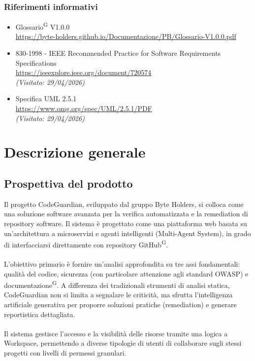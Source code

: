 \documentclass[a4paper, 11pt]{article}
\newcommand{\refterm}[1]{#1\textsuperscript{G}}
\newcommand{\lastVisited}[3]{\textit{(Visitato: #1/#2/#3)}}
\begin{document}
\subsubsection{Riferimenti informativi}
\begin{itemize}
	\item
		\refterm{Glossario} V1.0.0\\
		\url{https://byte-holders.github.io/Documentazione/PB/Glossario-V1.0.0.pdf}
	\item
		830-1998 - IEEE Recommended Practice for Software Requirements Specifications\\
		\url{https://ieeexplore.ieee.org/document/720574}\\
		\lastVisited{29}{04}{2026}
	\item
		Specifica UML 2.5.1\\
		\url{https://www.omg.org/spec/UML/2.5.1/PDF}\\
		\lastVisited{29}{04}{2026}
\end{itemize}

\section{Descrizione generale} \label{sec:descrizione generale}
\subsection{Prospettiva del prodotto}
Il progetto CodeGuardian, sviluppato dal gruppo Byte Holders, si colloca come una soluzione software avanzata per la verifica automatizzata e la remediation di repository software. Il sistema è progettato come una piattaforma web basata su un'architettura a microservizi e agenti intelligenti (Multi-Agent System), in grado di interfacciarsi direttamente con repository GitHub\textsuperscript{G}.
\\ \\
L'obiettivo primario è fornire un'analisi approfondita su tre assi fondamentali: qualità del codice, sicurezza (con particolare attenzione agli standard OWASP) e documentazione\textsuperscript{G}. A differenza dei tradizionali strumenti di analisi statica, CodeGuardian non si limita a segnalare le criticità, ma sfrutta l'intelligenza artificiale generativa per proporre soluzioni pratiche (remediation) e generare reportistica dettagliata.
\\ \\
Il sistema gestisce l'accesso e la visibilità delle risorse tramite una logica a Workspace, permettendo a diverse tipologie di utenti di collaborare sugli stessi progetti con livelli di permessi granulari.
\end{document}
